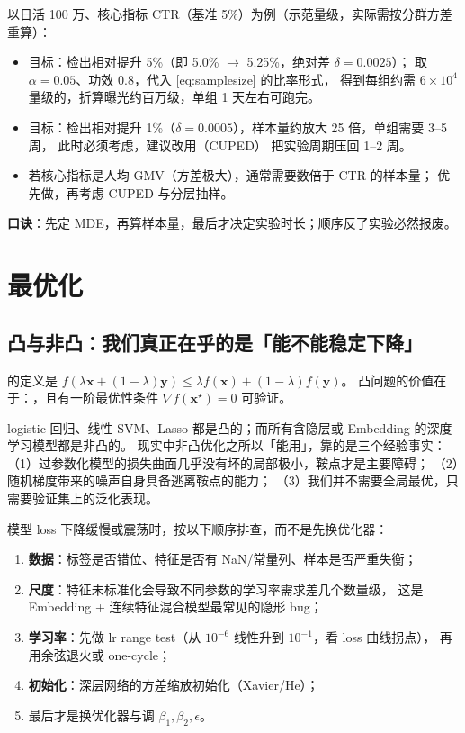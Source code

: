 \begin{toolbox}[A/B 实验最小样本量估算速查]
以日活 100 万、核心指标 CTR（基准 5\%）为例（示范量级，实际需按分群方差重算）：
\begin{itemize}
  \item 目标：检出相对提升 5\%（即 5.0\% $\to$ 5.25\%，绝对差 $\delta = 0.0025$）；
        取 $\alpha=0.05$、功效 0.8，代入 \cref{eq:samplesize} 的比率形式，
        得到每组约需 $6\times 10^4$ 量级的，折算曝光约百万级，单组 1 天左右可跑完。
  \item 目标：检出相对提升 1\%（$\delta = 0.0005$），样本量约放大 25 倍，单组需要 3--5 周，
        此时必须考虑，建议改用（CUPED）
        把实验周期压回 1--2 周。
  \item 若核心指标是人均 GMV（方差极大），通常需要数倍于 CTR 的样本量；
        优先做，再考虑 CUPED 与分层抽样。
\end{itemize}
\textbf{口诀}：先定 MDE，再算样本量，最后才决定实验时长；顺序反了实验必然报废。
\end{toolbox}

\section{最优化}

\subsection{凸与非凸：我们真正在乎的是「能不能稳定下降」}

 的定义是
$f(\lambda \bm{x} + (1-\lambda)\bm{y}) \le \lambda f(\bm{x}) + (1-\lambda) f(\bm{y})$。
凸问题的价值在于：，且有一阶最优性条件
$\nabla f(\bm{x}^\star) = 0$ 可验证。

logistic 回归、线性 SVM、Lasso 都是凸的；而所有含隐层或 Embedding 的深度学习模型都是非凸的。
现实中非凸优化之所以「能用」，靠的是三个经验事实：
（1）过参数化模型的损失曲面几乎没有坏的局部极小，鞍点才是主要障碍；
（2）随机梯度带来的噪声自身具备逃离鞍点的能力；
（3）我们并不需要全局最优，只需要验证集上的泛化表现。

\begin{pitfall}
模型 loss 下降缓慢或震荡时，按以下顺序排查，而不是先换优化器：
\begin{enumerate}
  \item \textbf{数据}：标签是否错位、特征是否有 NaN/常量列、样本是否严重失衡；
  \item \textbf{尺度}：特征未标准化会导致不同参数的学习率需求差几个数量级，
        这是 Embedding + 连续特征混合模型最常见的隐形 bug；
  \item \textbf{学习率}：先做 lr range test（从 $10^{-6}$ 线性升到 $10^{-1}$，看 loss 曲线拐点），
        再用余弦退火或 one-cycle；
  \item \textbf{初始化}：深层网络的方差缩放初始化（Xavier/He）\cite{he2016resnet}；
  \item 最后才是换优化器与调 $\beta_1,\beta_2,\epsilon$。
\end{enumerate}
\end{pitfall}

